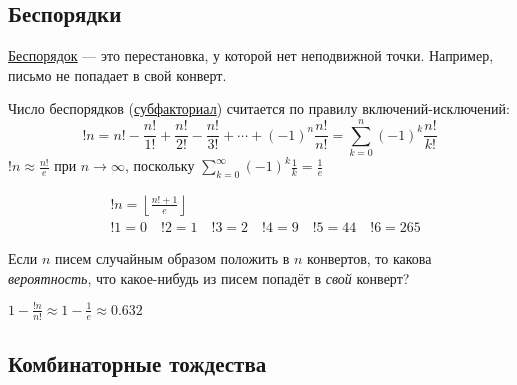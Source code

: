 \documentclass[a4paper,12pt,fleqn]{article}
\newenvironment{onsamepage} {\begin{minipage}{\textwidth}} {\end{minipage}}
\numberwithin{figure}{section}
\theoremstyle{definition}
\begin{document}
\subsection{Беспорядки}

\href{https://ru.wikipedia.org/wiki/%D0%91%D0%B5%D1%81%D0%BF%D0%BE%D1%80%D1%8F%D0%B4%D0%BE%D0%BA_(%D0%BF%D0%B5%D1%80%D0%B5%D1%81%D1%82%D0%B0%D0%BD%D0%BE%D0%B2%D0%BA%D0%B0)}{Беспорядок} --- это
перестановка, у которой нет неподвижной точки. Например, письмо не попадает в свой конверт.

Число беспорядков
(\href{https://ru.wikipedia.org/wiki/%D0%A1%D1%83%D0%B1%D1%84%D0%B0%D0%BA%D1%82%D0%BE%D1%80%D0%B8%D0%B0%D0%BB}{субфакториал})
считается по правилу включений-исключений:
\[	!n = n! -\frac{n!}{1!} +\frac{n!}{2!} -\frac{n!}{3!}+\dotsm+(-1)^n\frac{n!}{n!}
       = \sum_{k=0}^n (-1)^k\frac{n!}{k!}	\]
$!n \approx \frac{n!}{e}$ при $n\to\infty$,
поскольку $\sum_{k=0}^{\infty} (-1)^k\frac1k = \frac1e$

\begin{align*}
&	!n = \left\lfloor \frac{n!+1}{e} \right\rfloor \\
& 	!1 = 0		\quad
	!2 = 1		\quad
	!3 = 2		\quad
	!4 = 9		\quad
	!5 = 44		\quad
	!6 = 265
\end{align*}

\medskip
\begin{onsamepage}
\begin{problem}
	Если $n$ писем случайным образом положить в $n$ конвертов,
	то какова \textit{вероятность}, что какое-нибудь из писем
	попадёт в \textit{свой} конверт?
\end{problem}
\begin{solution}
	$1-\frac{!n}{n!} \approx 1-\frac1e \approx 0.632$
\end{solution}
\end{onsamepage}


\subsection{Комбинаторные тождества}
\end{document}
